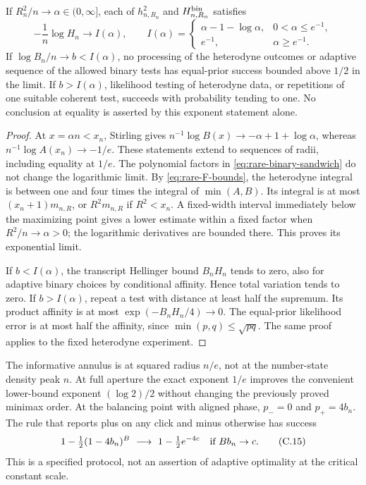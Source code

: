 \begin{theorem}
\label{thm:rare-exponent}
If $R_n^2/n\to\alpha\in(0,\infty]$, each of $h_{n,R_n}^2$ and
$H_{n,R_n}^{\rm bin}$ satisfies
\[
 -\frac1n\log H_n\longrightarrow I(\alpha),\qquad
 I(\alpha)=\begin{cases}
 \alpha-1-\log\alpha,&0<\alpha\le e^{-1},\\
 e^{-1},&\alpha\ge e^{-1}.
 \end{cases}
 \tag{C.14}\label{eq:rare-exponent}
\]
If $\log B_n/n\to b<I(\alpha)$, no processing of the heterodyne outcomes
or adaptive sequence of the allowed binary tests has equal-prior success
bounded above $1/2$ in the limit. If $b>I(\alpha)$, likelihood testing of
heterodyne data, or repetitions of one suitable coherent test, succeeds
with probability tending to one. No conclusion at equality is asserted by
this exponent statement alone.
\end{theorem}
\begin{proof}
At $x=\alpha n<x_n$, Stirling gives
$n^{-1}\log B(x)\to-\alpha+1+\log\alpha$, whereas
$n^{-1}\log A(x_n)\to-1/e$. These statements extend to sequences of radii,
including equality at $1/e$. The polynomial factors in
\eqref{eq:rare-binary-sandwich} do not change the logarithmic limit.
By \eqref{eq:rare-F-bounds}, the heterodyne integral is between one and four
times the integral of $\min(A,B)$. Its integral is at most
$(x_n+1)m_{n,R}$, or $R^2m_{n,R}$ if $R^2<x_n$.
A fixed-width interval immediately below the maximizing point gives a
lower estimate within a fixed factor when $R^2/n\to\alpha>0$; the
logarithmic derivatives are bounded there. This proves its exponential limit.

If $b<I(\alpha)$, the transcript Hellinger bound $B_nH_n$ tends to zero,
also for adaptive binary choices by conditional affinity. Hence total
variation tends to zero. If $b>I(\alpha)$, repeat a test with distance at
least half the supremum. Its product affinity is at most
$\exp(-B_nH_n/4)\to0$. The equal-prior likelihood error is at most half
the affinity, since $\min(p,q)\le\sqrt{pq}$. The same proof applies to the
fixed heterodyne experiment.
\end{proof}

The informative annulus is at squared radius $n/e$, not at the number-state
density peak $n$. At full aperture the exact exponent $1/e$ improves the
convenient lower-bound exponent $(\log2)/2$ without changing the previously
proved minimax order.
At the balancing point with aligned phase, $p_-=0$ and $p_+=4b_n$.
The rule that reports plus on any click and minus otherwise has success
\[
 1-\tfrac12(1-4b_n)^B\ \longrightarrow\ 1-\tfrac12e^{-4c}
 \quad\hbox{if }Bb_n\to c.
 \tag{C.15}\label{eq:rare-poisson}
\]
This is a specified protocol, not an assertion of adaptive optimality at
the critical constant scale.

